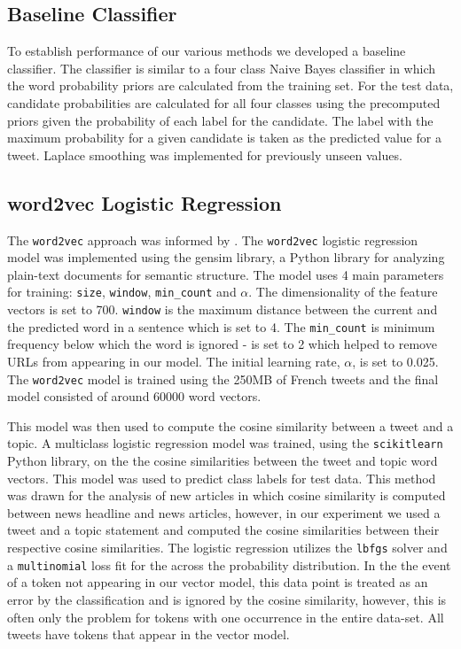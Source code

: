 \documentclass[journal]{IEEEtran}
\newcommand{\code}[1]{\texttt{#1}}
\begin{document}
\subsection{Baseline Classifier} 
To establish performance of our various methods we developed a baseline classifier. The classifier is similar to a four class Naive Bayes classifier in which the word probability priors are calculated from the training set. For the test data, candidate probabilities are calculated for all four classes using the precomputed priors given the probability of each label for the candidate. The label with the maximum probability for a given candidate is taken as the predicted value for a tweet. Laplace smoothing was implemented for previously unseen values. 

\subsection{word2vec Logistic Regression}
The \code{word2vec} \cite{DBLP:journals/corr/abs-1301-3781} approach was informed by \cite{MOHAMMAD16.232,DBLP:conf/starsem/SobhaniMK16}.
The \code{word2vec} logistic regression model was implemented using the gensim \cite{rehurek_lrec} library, a Python library for analyzing plain-text documents for semantic structure. The model uses 4 main parameters for training: \code{size}, \code{window}, \code{min\_count} and $\alpha$. The dimensionality of the feature vectors is set to 700. \code{window} is the maximum distance between the current and the predicted word in a sentence which is set to 4. The \code{min\_count} is minimum frequency below which the word is ignored - is set to 2 which helped to remove URLs from appearing in our model. The initial learning rate, $\alpha$, is set to 0.025. The \code{word2vec} model is trained using the 250MB of French tweets and the final model consisted of around 60000 word vectors.

This model was then used to compute the cosine similarity between a tweet and a topic. A multiclass logistic regression model was trained, using the \code{scikitlearn} \cite{scikit-learn} Python library, on the the cosine similarities between the tweet and topic word vectors. This model was used to predict class labels for test data. This method was drawn for the analysis of new articles in which cosine similarity is computed between news headline and news articles, however, in our experiment we used a tweet and a topic statement and computed the cosine similarities between their respective cosine similarities. The logistic regression utilizes the \code{lbfgs} solver and a \code{multinomial} loss fit for the across the probability distribution. In the the event of a token not appearing in our vector model, this data point is treated as an error by the classification and is ignored by the cosine similarity, however, this is often only the problem for tokens with one occurrence in the entire data-set. All tweets have tokens that appear in the vector model. 
\end{document}
